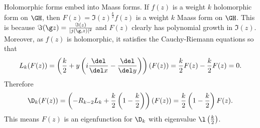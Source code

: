     \begin{remark}\label{rem:holomorphic_embedds_into_Maass}
      Holomorphic forms embed into Maass forms. If $f(z)$ is a weight $k$ holomorphic form on $\GH$, then $F(z) = \Im(z)^{\frac{k}{2}}f(z)$ is a weight $k$ Maass form on $\GH$. This is because $\Im(\g z) = \frac{\Im(z)}{|j(\g,z)|^{2}}$ and $F(z)$ clearly has polynomial growth in $\Im(z)$. Moreover, as $f(z)$ is holomorphic, it satisfies the Cauchy-Riemann equations so that
      \[
        L_{k}(F(z)) = \left(\frac{k}{2}+y\left(i\frac{\del}{\del x}-\frac{\del}{\del y}\right)\right)(F(z)) = \frac{k}{2}F(z)-\frac{k}{2}F(z) = 0.
      \]
      Therefore
      \[
        \D_{k}(F(z)) = \left(-R_{k-2}L_{k}+\frac{k}{2}\left(1-\frac{k}{2}\right)\right)(F(z)) = \frac{k}{2}\left(1-\frac{k}{2}\right)F(z).
      \]
      This means $F(z)$ is an eigenfunction for $\D_{k}$ with eigenvalue $\l\left(\frac{k}{2}\right)$.
    \end{remark}
  
